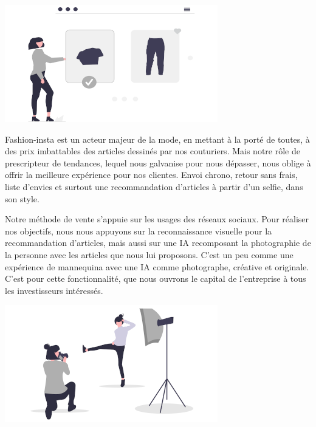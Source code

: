 \documentclass[landscape,a0paper,fontscale=0.285]{baposter} %
\begin{document}
\begin{poster}
{\begin{multicols}{2}
\vspace{1em}
\begin{center}
\includegraphics[width=0.8\linewidth]{web_shopping}
\end{center}

Fashion-insta est un acteur majeur de la mode, en mettant à la porté de toutes, à des prix imbattables des articles dessinés par nos couturiers. Mais notre rôle de prescripteur de tendances, lequel nous galvanise pour nous dépasser, nous oblige à offrir la meilleure expérience pour nos clientes. Envoi chrono, retour sans frais, liste d’envies et surtout une recommandation d’articles à partir d’un selfie, dans son style.

\end{multicols}


\begin{multicols}{2}
\vspace{1em}

Notre méthode de vente s’appuie sur les usages des réseaux sociaux. Pour réaliser nos objectifs, nous nous appuyons sur la reconnaissance visuelle pour la recommandation d’articles, mais aussi sur une IA recomposant la photographie de la personne avec les articles que nous lui proposons. C’est un peu comme une expérience de mannequina avec une IA comme photographe, créative et originale. C’est pour cette fonctionnalité, que nous ouvrons le capital de l’entreprise à tous les investisseurs intéressés.


\begin{center}
\includegraphics[width=0.8\linewidth]{shooting}
\end{center}


\end{multicols}}
\end{poster}
\end{document}

